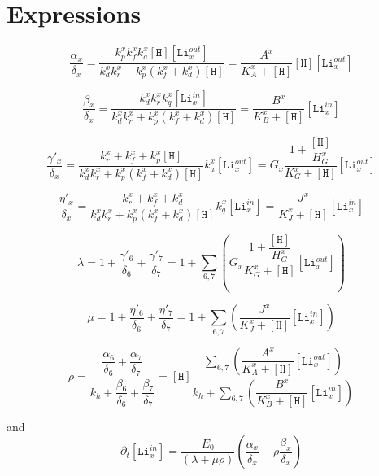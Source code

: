 \documentclass[aps,onecolumn,11pt]{revtex4}
\newcommand{\mychem}[1]{\mathtt{#1}}
\newcommand{\myconc}[1]{\left\lbrack{#1}\right\rbrack}
\newcommand{\LiIn}[1]{\myconc{\mychem{Li}_{#1}^{in}}}
\newcommand{\LiOut}[1]{\myconc{\mychem{Li}_{#1}^{out}}}
\newcommand{\Hin}{\myconc{\mychem{H}}}
\begin{document}
\section{Expressions}

\begin{equation}
	\dfrac{\alpha_x}{\delta_x} 
	= \dfrac{k_{p}^x k_f^x k_{a}^x \Hin\LiOut{x}}{k_d^x k_r^x + k_{p}^x\left(k_f^x+k_d^x\right)\Hin}
	= \dfrac{A^x}{K_A^x+\Hin} \Hin \LiOut{x}
\end{equation}

\begin{equation}
	\dfrac{\beta_x}{\delta_x} 
	= \dfrac{k_d^x k_r^x k_{q}^x \LiIn{x}}{k_d^x k_r^x + k_{p}^x\left(k_f^x+k_d^x\right)\Hin}
	= \dfrac{B^x}{K_B^x+\Hin} \LiIn{x}
\end{equation}

\begin{equation}
	\dfrac{\gamma'_x}{\delta_x}
	=\dfrac{k_r^x + k_f^x + k_p^x \Hin }{k_d^x k_r^x + k_{p}^x\left(k_f^x+k_d^x\right)\Hin} k_a^x \LiOut{x}
	= G_x \dfrac{1+\dfrac{\Hin}{H_G^x}}{K_G^x+\Hin} \LiOut{x}
\end{equation}
	
\begin{equation}
	\dfrac{\eta'_x}{\delta_x}
	=\dfrac{k_r^x + k_f^x + k_d^x}{k_d^x k_r^x + k_{p}^x\left(k_f^x+k_d^x\right)\Hin} k_q^x \LiIn{x}
	= \dfrac{J^x}{K_J^x+\Hin} \LiIn{x}
\end{equation}
	
\begin{equation}
	\lambda = 1 + \dfrac{\gamma'_6}{\delta_6} + \dfrac{\gamma'_7}{\delta_7} 
	= 1 + \sum_{6,7}\left(G_x \dfrac{1+\dfrac{\Hin}{H_G^x}}{K_G^x+\Hin}\LiOut{x} \right) 
\end{equation}
	
\begin{equation}
	\mu = 	1 + \dfrac{\eta'_6}{\delta_6} + \dfrac{\eta'_7}{\delta_7}
	= 1 + \sum_{6,7} \left( \dfrac{J^x}{K_J^x+\Hin} \LiIn{x} \right)
\end{equation}

\begin{equation}
\rho = \dfrac{\dfrac{\alpha_6}{\delta_6}+\dfrac{\alpha_7}{\delta_7}}
	{k_h+\dfrac{\beta_6}{\delta_6}+\dfrac{\beta_7}{\delta_7}}
	= \Hin \dfrac
	{\displaystyle\sum_{6,7} \left(\dfrac{A^x}{K_A^x+\Hin}  \LiOut{x}\right)}
	{\displaystyle k_h+\sum_{6,7}\left(\dfrac{B^x}{K_B^x+\Hin} \LiIn{x}\right)}
\end{equation}

and
\begin{equation}
	\partial_t\LiIn{x} = \dfrac{E_0}{\left(\lambda + \mu \rho\right)}
	\left(\dfrac{\alpha_x}{\delta_x} - \rho \dfrac{\beta_x}{\delta_x}\right)
\end{equation}
\end{document}

